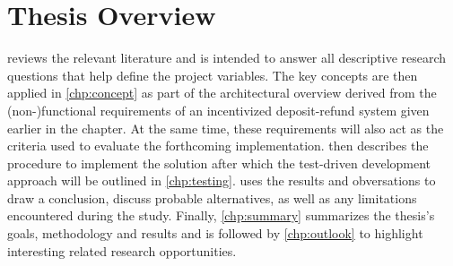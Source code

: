 \section{Thesis Overview}
 reviews the relevant literature and is intended to answer all descriptive research questions that help define the project variables. The key concepts are then applied in \cref{chp:concept} as part of the architectural overview derived from the (non-)functional requirements of an incentivized deposit-refund system given earlier in the chapter. At the same time, these requirements will also act as the criteria used to evaluate the forthcoming implementation.  then describes the procedure to implement the solution after which the test-driven development approach will be outlined in \cref{chp:testing}.  uses the results and obversations to draw a conclusion, discuss probable alternatives, as well as any limitations encountered during the study. Finally, \cref{chp:summary} summarizes the thesis's goals, methodology and results and is followed by \cref{chp:outlook} to highlight interesting related research opportunities.